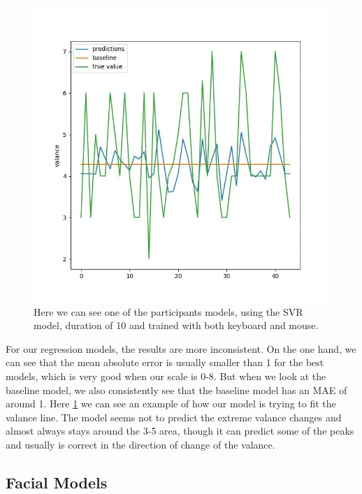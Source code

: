 \documentclass[../main.tex]{subfiles}
\begin{document}
    \begin{figure}
        \centering
        \includegraphics[width=14cm]{figures/results/reg_fit}   
        \caption{Here we can see one of the participants models, using the SVR model, duration of 10 and trained with both keyboard and mouse.}
        \label{fig:reg_fit} 
    \end{figure}

    For our regression models, the results are more inconsistent. On the one hand, we can see that the mean absolute error is usually 
    smaller than 1 for the best models, which is very good when our scale is 0-8. But when we look at the baseline model, 
    we also consistently see that the baseline model has an MAE of around 1. Here \ref{fig:reg_fit} we can see an example of 
    how our model is trying to fit the valance line. The model seems not to predict the extreme valance changes and almost always 
    stays around the 3-5 area, though it can predict some of the peaks and usually is correct in the direction of change of the valance.

    \newpage

    \subsection{Facial Models}
\end{document}
